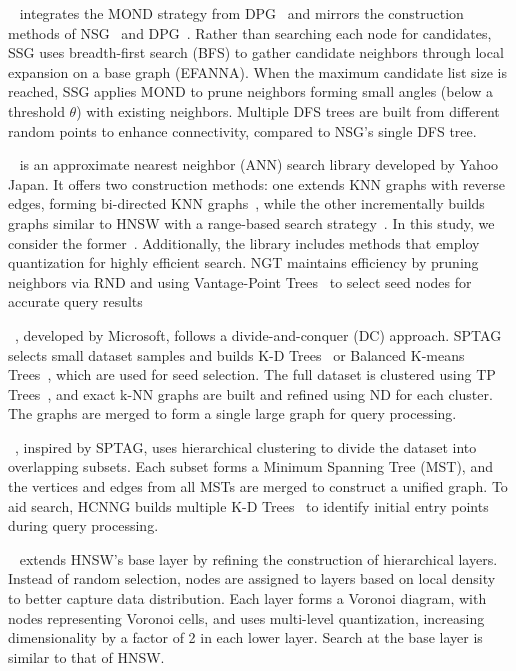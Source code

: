 ~\cite{nssg} integrates the MOND strategy from DPG~\cite{dpg} and mirrors the construction methods of NSG~\cite{nsg} and DPG~\cite{dpg}. Rather than searching each node for candidates, SSG uses breadth-first search (BFS) to gather candidate neighbors through local expansion on a base graph (EFANNA). When the maximum candidate list size is reached, SSG applies MOND to prune neighbors forming small angles (below a threshold \( \theta \)) with existing neighbors. Multiple DFS trees are built from different random points to enhance connectivity, compared to NSG's single DFS tree.

~\cite{ngt_library} is an approximate nearest neighbor (ANN) search library developed by Yahoo Japan. It offers two construction methods: one extends KNN graphs with reverse edges, forming bi-directed KNN graphs~\cite{ngtpanng1}, while the other incrementally builds graphs similar to HNSW with a range-based search strategy~\cite{ngtpanng2}.  In this study, we consider the former~\cite{ngtpanng1}. Additionally, the library includes methods that employ quantization for highly efficient search.
NGT maintains efficiency by pruning neighbors via RND and using Vantage-Point Trees~\cite{vptree} to select seed nodes for accurate query results

~\cite{SPTAG4}, developed by Microsoft, follows a divide-and-conquer (DC) approach. SPTAG selects small dataset samples and builds K-D Trees~\cite{kdtree} or Balanced K-means Trees~\cite{bkmtree}, which are used for seed selection. The full dataset is clustered using TP Trees~\cite{tptree}, and exact k-NN graphs are built and refined using ND for each cluster. The graphs are merged to form a single large graph for query processing.

~\cite{hcnng}, inspired by SPTAG, uses hierarchical clustering to divide the dataset into overlapping subsets. Each subset forms a Minimum Spanning Tree (MST), and the vertices and edges from all MSTs are merged to construct a unified graph. To aid search, HCNNG builds multiple K-D Trees~\cite{kdtree} to identify initial entry points during query processing.

~\cite{hvs} extends HNSW's base layer by refining the construction of hierarchical layers. Instead of random selection, nodes are assigned to layers based on local density to better capture data distribution. Each layer forms a Voronoi diagram, with nodes representing Voronoi cells, 
and uses multi-level quantization, increasing dimensionality by a factor of 2 in each lower layer.
Search at the base layer is similar to that of HNSW.

